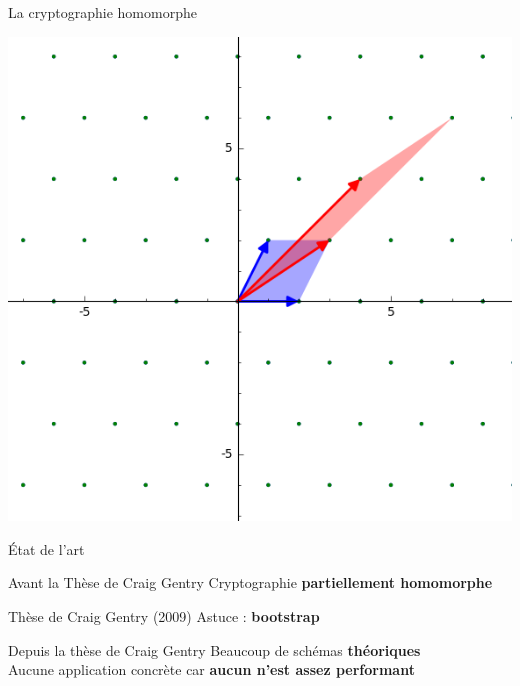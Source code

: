 \begin{frame}{La cryptographie homomorphe}
    \begin{center}
    \includegraphics[scale=0.43]{images/exemple_reseau2.png} 
    \end{center}
\end{frame}{}

\begin{frame}{État de l'art}
    \begin{alertblock}{Avant la Thèse de Craig Gentry}
    Cryptographie \textbf{partiellement homomorphe}
    \end{alertblock}
    \begin{alertblock}{Thèse de Craig Gentry (2009)}
    Astuce : \textbf{bootstrap}
    \end{alertblock}
    \begin{alertblock}{Depuis la thèse de Craig Gentry}
        Beaucoup de schémas \textbf{théoriques}\\
        Aucune application concrète car \textbf{aucun n'est assez performant}
    \end{alertblock}{}
\end{frame}{}



